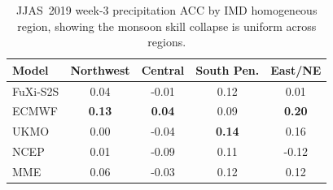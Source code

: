 \begin{table}[t]
  \centering
  \caption{JJAS~2019 week-3 precipitation ACC by IMD homogeneous region, showing the monsoon skill collapse is uniform across regions.}
  \label{tab:reg_jjas_tp_w3}
  \small
  \begin{tabular}{lcccc}
    \toprule
    Model & Northwest & Central & South Pen. & East/NE \\
    \midrule
    FuXi-S2S       & 0.04 & -0.01 & 0.12 & 0.01 \\
ECMWF          & \textbf{0.13} & \textbf{0.04} & 0.09 & \textbf{0.20} \\
UKMO           & 0.00 & -0.04 & \textbf{0.14} & 0.16 \\
NCEP           & 0.01 & -0.09 & 0.11 & -0.12 \\
MME            & 0.06 & -0.03 & 0.12 & 0.12 \\
    \bottomrule
  \end{tabular}
\end{table}
